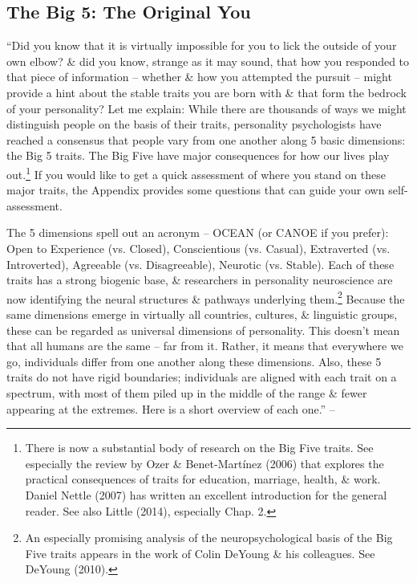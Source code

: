 \documentclass{article}
\numberwithin{equation}{section}
\begin{document}
\subsection{The Big 5: The Original You}
``Did you know that it is virtually impossible for you to lick the outside of your own elbow? \& did you know, strange as it may sound, that how you responded to that piece of information -- whether \& how you attempted the pursuit -- might provide a hint about the stable traits you are born with \& that form the bedrock of your personality? Let me explain: While there are thousands of ways we might distinguish people on the basis of their traits, personality psychologists have reached a consensus that people vary from one another along 5 basic dimensions: the Big 5 traits. The Big Five have major consequences for how our lives play out.\footnote{There is now a substantial body of research on the Big Five traits. See especially the review by Ozer \& Benet-Mart\'inez (2006) that explores the practical consequences of traits for education, marriage, health, \& work. Daniel Nettle (2007) has written an excellent introduction for the general reader. See also Little (2014), especially Chap. 2.} If you would like to get a quick assessment of where you stand on these major traits, the Appendix provides some questions that can guide your own self-assessment.

The 5 dimensions spell out an acronym -- OCEAN (or CANOE if you prefer): Open to Experience (vs. Closed), Conscientious (vs. Casual), Extraverted (vs. Introverted), Agreeable (vs. Disagreeable), Neurotic (vs. Stable). Each of these traits has a strong biogenic base, \& researchers in personality neuroscience are now identifying the neural structures \& pathways underlying them.\footnote{An especially promising analysis of the neuropsychological basis of the Big Five traits appears in the work of Colin DeYoung \& his colleagues. See DeYoung (2010).} Because the same dimensions emerge in virtually all countries, cultures, \& linguistic groups, these can be regarded as universal dimensions of personality. This doesn't mean that all humans are the same -- far from it. Rather, it means that everywhere we go, individuals differ from one another along these dimensions. Also, these 5 traits do not have rigid boundaries; individuals are aligned with each trait on a spectrum, with most of them piled up in the middle of the range \& fewer appearing at the extremes. Here is a short overview of each one.'' -- \cite[pp. 14--16]{Little2017}
\end{document}

